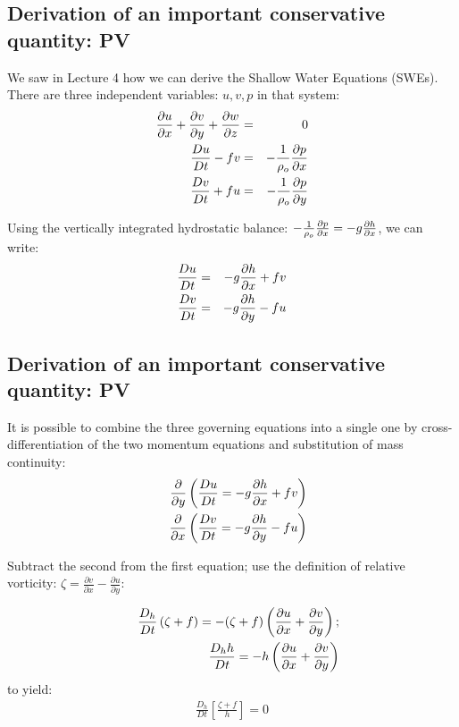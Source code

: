 \subsection{Derivation of an important conservative quantity: PV}

We saw in Lecture 4 how we can derive the Shallow Water Equations (SWEs). There are three independent variables: $u,v,p$ in that system:
\begin{eqnarray}
	\frac{\partial u}{\partial x}+\frac{\partial v}{\partial y}+\frac{\partial w}{\partial z} & = & 0 \\
	\frac{D u}{D t}-fv & = & -\frac{1}{\rho_o}\frac{\partial p}{\partial x} \\
	\frac{D v}{D t}+fu & = & -\frac{1}{\rho_o}\frac{\partial p}{\partial y}
\end{eqnarray}

Using the vertically integrated hydrostatic balance: $-\frac{1}{\rho_o} \frac{\partial p}{\partial x} = -g \frac{\partial h}{\partial x}$, we can write: 
\begin{eqnarray}
	\frac{D u}{D t} & = & -g\frac{\partial h}{\partial x} +fv\\
	\frac{D v}{D t} & = & -g\frac{\partial h}{\partial y} -fu
\end{eqnarray}


\subsection{Derivation of an important conservative quantity: PV}

It is possible to combine the three governing equations into a single one by cross-differentiation of the two momentum equations and substitution of mass continuity:
\begin{eqnarray}
	&&\frac{\partial}{\partial y} \left( \frac{D u}{D t} = -g\frac{\partial h}{\partial x} +fv \right) \\
	&&\frac{\partial}{\partial x} \left( \frac{D v}{D t} = -g\frac{\partial h}{\partial y} -fu \right) 
\end{eqnarray}

Subtract the second from the first equation; use the definition of relative vorticity: $\zeta = \frac{\partial v}{\partial x} - \frac{\partial u}{\partial y}$:

\begin{eqnarray}
	&&\frac{D_h}{Dt}\left({\zeta+f}\right) = -(\zeta+f) \left( \frac{\partial u}{\partial x} + \frac{\partial v}{\partial y} \right);\\
	&&\frac{D_h h}{D t} = -h \left( \frac{\partial u}{\partial x} + \frac{\partial v}{\partial y} \right)
\end{eqnarray}
to yield:
\begin{eqnarray}
	\frac{D_h}{Dt}\left[\frac {\zeta+f}{h} \right]=0
	\label{PVcons}
\end{eqnarray} 

